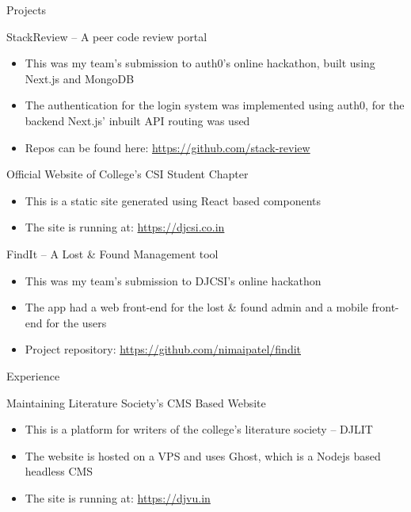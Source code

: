 \documentclass{article}
\newlength{\tabin}
\newlength{\secsep}
\newcommand{\lineunder}{\vspace*{-8pt} \\ \hspace*{-6pt} \hrulefill \\ \vspace*{-15pt}}
\newenvironment{tabbedsection}[1]{
	\begin{list}{}{
		\setlength{\itemsep}{0pt}
		\setlength{\labelsep}{0pt}
		\setlength{\labelwidth}{0pt}
		\setlength{\leftmargin}{\tabin}
		\setlength{\rightmargin}{\tabin}
		\setlength{\listparindent}{0pt}
		\setlength{\parsep}{0pt}
		\setlength{\parskip}{0pt}
		\setlength{\partopsep}{0pt}
		\setlength{\topsep}{#1}
	}
	\item[]
}{\end{list}}
\newenvironment{resume_section}[1]{
	\filbreak
	\vspace{2\secsep}
	\textsc{\large#1}
	\lineunder
	\begin{tabbedsection}{\secsep}
}{\end{tabbedsection}}
\newenvironment{resume_subsection}[2][]{
	\textbf{#2} \hfill {\footnotesize #1} \hspace{2em}
	\begin{tabbedsection}{0.5\secsep}
}{\end{tabbedsection}}
\newenvironment{subitems}{
	\renewcommand{\labelitemi}{-}
	\begin{itemize}
		\setlength{\labelsep}{1em}
}{\end{itemize}}
\begin{document}
\begin{resume_section}{Projects}

	\begin{resume_subsection}{StackReview -- A peer code review portal}
		\begin{subitems}
			\item This was my team's submission to auth0's online hackathon, built using Next.js and MongoDB
			\item The authentication for the login system was implemented using auth0, for the backend Next.js' inbuilt API routing was used
			\item Repos can be found here: \href{https://github.com/stack-review}{https://github.com/stack-review}
		\end{subitems}
	\end{resume_subsection}

	\begin{resume_subsection}{Official Website of College's CSI Student Chapter}
		\begin{subitems}
			\item This is a static site generated using React based components
			\item The site is running at: \href{https://djcsi.co.in}{https://djcsi.co.in}
		\end{subitems}
	\end{resume_subsection}

	\begin{resume_subsection}{FindIt -- A Lost {\&} Found Management tool}
		\begin{subitems}
			\item This was my team's submission to DJCSI's online hackathon
		\item The app had a web front-end for the lost {\&} found admin and a mobile front-end for the users
			\item Project repository: \href{https://github.com/nimaipatel/findit}{https://github.com/nimaipatel/findit}
		\end{subitems}
	\end{resume_subsection}

\end{resume_section}

\begin{resume_section}{Experience}

	\begin{resume_subsection}{Maintaining Literature Society's CMS Based Website}
		\begin{subitems}
			\item This is a platform for writers of the college's literature society -- DJLIT
			\item The website is hosted on a VPS and uses Ghost, which is a Nodejs based headless CMS
			\item The site is running at: \href{https://djvu.in}{https://djvu.in}
		\end{subitems}
	\end{resume_subsection}

\end{resume_section}
\end{document}
